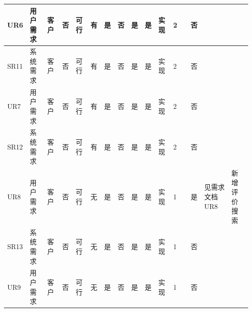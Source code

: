 \documentclass[a4paper]{ctexart}
\begin{document}
{\begin{longtable}{|P{4em}|P{4em}|P{2em}|P{2em}|P{2em}|P{1em}|P{3em}|P{3em}|P{4em}|P{4em}|P{2em}|P{2em}|P{3em}|P{3em}|P{4em}|P{4em}|}
  \hline
  UR6                                          & 用户需求                            & 客户                                         & 否                                            & 可行                    & 有   & 是           & 否           & 是             & 是             & 实现     & 2      &            & 否           &                 &                        \\
  \hline
  SR11                                         & 系统需求                            & 客户                                         & 否                                            & 可行                    & 有   & 是           & 否           & 是             & 是             & 实现     & 2      &            & 否           &                 &                        \\
  \hline
  UR7                                          & 用户需求                            & 客户                                         & 否                                            & 可行                    & 有   & 是           & 否           & 是             & 是             & 实现     & 2      &            & 否           &                 &                        \\
  \hline
  SR12                                         & 系统需求                            & 客户                                         & 否                                            & 可行                    & 有   & 是           & 否           & 是             & 是             & 实现     & 2      &            & 否           &                 &                        \\
  \hline
  UR8                                          & 用户需求                            & 客户                                         & 否                                            & 可行                    & 无   & 是           & 否           & 是             & 是             & 实现     & 1      &            & 是           & 见需求文档 UR8  & 新增评价搜索           \\
  \hline
  SR13                                         & 系统需求                            & 客户                                         & 否                                            & 可行                    & 无   & 是           & 否           & 是             & 是             & 实现     & 1      &            & 否           &                 &                        \\
  \hline
  UR9                                          & 用户需求                            & 客户                                         & 否                                            & 可行                    & 无   & 是           & 否           & 是             & 是             & 实现     & 1      &            & 否           &                 &                        \\

\end{longtable}}
\end{document}
